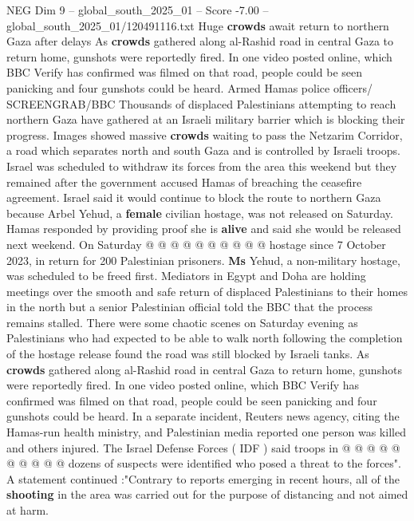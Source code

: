 \begin{textsample}{NEG Dim 9 – global\_south\_2025\_01 – Score -7.00 – global\_south\_2025\_01/120491116.txt}  \label{ex:f9_neg_138}
Huge \textbf{crowds} await return to northern Gaza after delays As \textbf{crowds} gathered along al-Rashid road in central Gaza to return home, gunshots were reportedly fired.
In one video posted online, which BBC Verify has confirmed was filmed on that road, people could be seen panicking and four gunshots could be heard.
Armed Hamas police officers/ SCREENGRAB/BBC Thousands of displaced Palestinians attempting to reach northern Gaza have gathered at an Israeli military barrier which is blocking their progress.
Images showed massive \textbf{crowds} waiting to pass the Netzarim Corridor, a road which separates north and south Gaza and is controlled by Israeli troops.
Israel was scheduled to withdraw its forces from the area this weekend but they remained after the government accused Hamas of breaching the ceasefire agreement.
Israel said it would continue to block the route to northern Gaza because Arbel Yehud, a \textbf{female} civilian hostage, was not released on Saturday.
Hamas responded by providing proof she is \textbf{alive} and said she would be released next weekend.
On Saturday @ @ @ @ @ @ @ @ @ @ hostage since 7 October 2023, in return for 200 Palestinian prisoners. \textbf{Ms} Yehud, a non-military hostage, was scheduled to be freed first.
Mediators in Egypt and Doha are holding meetings over the smooth and safe return of displaced Palestinians to their homes in the north but a senior Palestinian official told the BBC that the process remains stalled.
There were some chaotic scenes on Saturday evening as Palestinians who had expected to be able to walk north following the completion of the hostage release found the road was still blocked by Israeli tanks.
As \textbf{crowds} gathered along al-Rashid road in central Gaza to return home, gunshots were reportedly fired.
In one video posted online, which BBC Verify has confirmed was filmed on that road, people could be seen panicking and four gunshots could be heard.
In a separate incident, Reuters news agency, citing the Hamas-run health ministry, and Palestinian media reported one person was killed and others injured.
The Israel Defense Forces ( IDF ) said troops in @ @ @ @ @ @ @ @ @ @ dozens of suspects were identified who posed a threat to the forces".
A statement continued :"Contrary to reports emerging in recent hours, all of the \textbf{shooting} in the area was carried out for the purpose of distancing and not aimed at harm.

\end{textsample}
